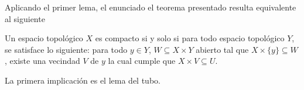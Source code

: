 Aplicando el primer lema, el enunciado el teorema presentado resulta equivalente
al siguiente

\begin{Teo}
  Un espacio topológico $X$ es compacto si y solo si
  para todo espacio topológico $Y$, se satisface lo siguiente: para todo $y\in Y$,
  $W\subseteq X\times Y$ abierto tal que $X\times\{y\}\subseteq W$, existe una vecindad
  $V$ de $y$ la cual cumple que $X\times V\subseteq U$.
\end{Teo}
\begin{Demo}
  La primera implicación es el lema del tubo.
\end{Demo}

